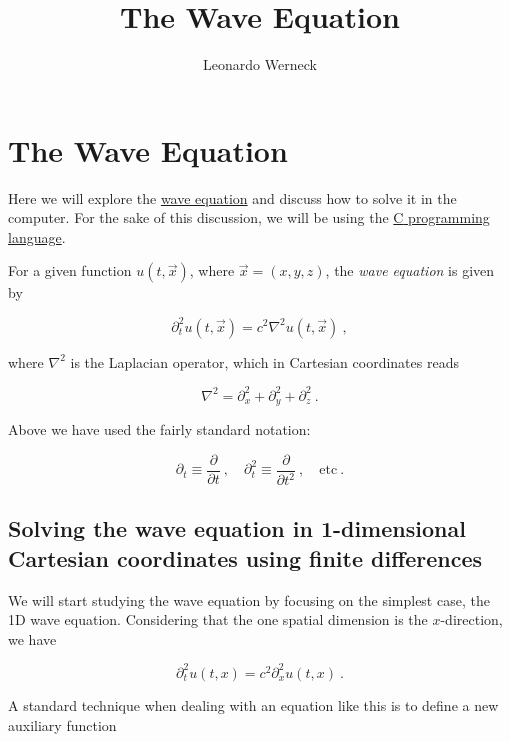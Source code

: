 \documentclass[a4paper,11pt]{article}
\title{The Wave Equation}
\author{Leonardo Werneck}
\def\cpp{{C\nolinebreak[4]\hspace{-.05em}\raisebox{.4ex}{\tiny\bf ++}}}
\begin{document}
\maketitle
\tableofcontents

\section{The Wave Equation}

Here we will explore the \href{https://en.wikipedia.org/wiki/Wave_equation}{wave equation} and discuss how to solve it in the computer. For the sake of this discussion, we will be using the \href{https://en.wikipedia.org/wiki/C\%2B\%2B}{{\cpp} programming language}.

For a given function $u(t,\vec{x})$, where $\vec{x}=(x,y,z)$, the \emph{wave equation} is given by

\begin{equation}
\partial_{t}^{2}u(t,\vec{x}) = c^{2}\nabla^{2}u(t,\vec{x})\ ,
\end{equation}

\noindent where $\nabla^{2}$ is the Laplacian operator, which in Cartesian coordinates reads

\begin{equation}
\nabla^{2} = \partial_{x}^{2} + \partial_{y}^{2} + \partial_{z}^{2}\ .
\end{equation}

\noindent Above we have used the fairly standard notation:

\begin{equation}
\partial_{t} \equiv \frac{\partial}{\partial t}\ ,\quad \partial_{t}^{2} \equiv \frac{\partial}{\partial t^{2}}\ , \quad \text{etc}\ .
\end{equation}

\subsection{Solving the wave equation in 1-dimensional Cartesian coordinates using finite differences}

We will start studying the wave equation by focusing on the simplest case, the 1D wave equation. Considering that the one spatial dimension is the $x$-direction, we have

\begin{equation}
\partial_{t}^{2}u(t,x) = c^{2}\partial_{x}^{2}u(t,x)\ .
\end{equation}

A standard technique when dealing with an equation like this is to define a new auxiliary function
\end{document}
